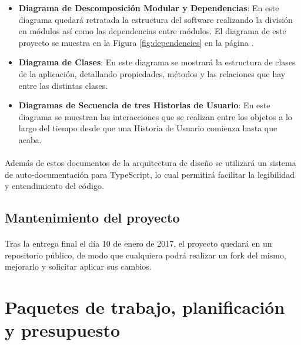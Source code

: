 \documentclass{article}
\begin{document}
            \begin{itemize}
            	\item \textbf{Diagrama de Descomposición Modular y Dependencias}: En este diagrama quedará retratada la estructura del software realizando la división en módulos así como las dependencias entre módulos. El diagrama de este proyecto se muestra en la Figura \ref{fig:dependencies} en la página \pageref{fig:dependencies}.
            	\item \textbf{Diagrama de Clases}: En este diagrama se mostrará la estructura de clases de la aplicación, detallando propiedades, métodos y las relaciones que hay entre las distintas clases.
				\item \textbf{Diagramas de Secuencia de tres Historias de Usuario}: En este diagrama se muestran las interacciones que se realizan entre los objetos a lo largo del tiempo desde que una Historia de Usuario comienza hasta que acaba.
                
            \end{itemize}
			
            \paragraph{}
            Además de estos documentos de la arquitectura de diseño se utilizará un sistema de auto-documentación para TypeScript, lo cual permitirá facilitar la legibilidad y entendimiento del código.
            
            
       	\subsection{Mantenimiento del proyecto}

			\paragraph{} Tras la entrega final el día 10 de enero de 2017, el proyecto quedará en un repositorio público, de modo que cualquiera podrá realizar un fork del mismo, mejorarlo y solicitar aplicar sus cambios. 


	\clearpage
  	\section{Paquetes de trabajo, planificación y presupuesto}
\end{document}

